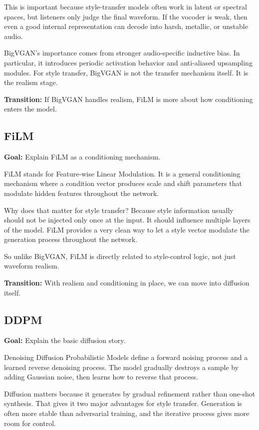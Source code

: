 \documentclass[11pt]{article}
\begin{document}
This is important because style-transfer models often work in latent or spectral spaces, but listeners only judge the final waveform. If the vocoder is weak, then even a good internal representation can decode into harsh, metallic, or unstable audio.

BigVGAN's importance comes from stronger audio-specific inductive bias. In particular, it introduces periodic activation behavior and anti-aliased upsampling modules. For style transfer, BigVGAN is not the transfer mechanism itself. It is the realism stage.

\textbf{Transition:} If BigVGAN handles realism, FiLM is more about how conditioning enters the model.

\subsection*{FiLM}
\textbf{Goal:} Explain FiLM as a conditioning mechanism.

FiLM stands for Feature-wise Linear Modulation. It is a general conditioning mechanism where a condition vector produces scale and shift parameters that modulate hidden features throughout the network.

Why does that matter for style transfer? Because style information usually should not be injected only once at the input. It should influence multiple layers of the model. FiLM provides a very clean way to let a style vector modulate the generation process throughout the network.

So unlike BigVGAN, FiLM is directly related to style-control logic, not just waveform realism.

\textbf{Transition:} With realism and conditioning in place, we can move into diffusion itself.

\subsection*{DDPM}
\textbf{Goal:} Explain the basic diffusion story.

Denoising Diffusion Probabilistic Models define a forward noising process and a learned reverse denoising process. The model gradually destroys a sample by adding Gaussian noise, then learns how to reverse that process.

Diffusion matters because it generates by gradual refinement rather than one-shot synthesis. That gives it two major advantages for style transfer. Generation is often more stable than adversarial training, and the iterative process gives more room for control.
\end{document}
